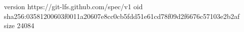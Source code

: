 version https://git-lfs.github.com/spec/v1
oid sha256:03581200603f0011a20607e8cc0cb5fdd51e61cd78f09d2f6676c57103e2b2af
size 24084
